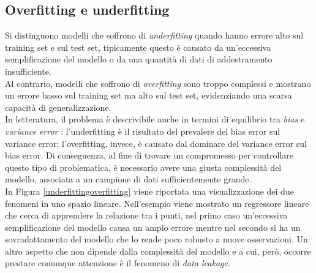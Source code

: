 \documentclass[12pt]{report}
\theoremstyle{definition}
\begin{document}
\subsection{Overfitting e underfitting}
Si distinguono modelli che soffrono di \textit{underfitting} quando hanno errore alto sul training set e sul test set, tipicamente questo è causato da un'eccessiva semplificazione del modello o da una quantità di dati di addestramento insufficiente.
\\
Al contrario, modelli che soffrono di \textit{overfitting} sono troppo complessi e mostrano un errore basso sul training set ma alto sul test set, evidenziando una scarsa capacità di generalizzazione.
\\
In letteratura, il problema è descrivibile anche in termini di equilibrio tra \textit{bias} e \textit{variance error} \cite{31}: l'underfitting è il risultato del prevalere del bias error sul variance error; l'overfitting, invece, è causato dal dominare del variance error sul bias error.
Di conseguenza, al fine di trovare un compromesso per controllare questo tipo di problematica, è necessario avere una giusta complessità del modello, associata a un campione di dati sufficientemente grande.
\\
In Figura \ref{underfittingoverfitting} viene riportata una visualizzazione dei due fenomeni in uno spazio lineare. Nell'esempio viene mostrato un regressore lineare che cerca di apprendere la relazione tra i punti, nel primo caso un'eccessiva semplificazione del modello causa un ampio errore mentre nel secondo si ha un sovradattamento del modello che lo rende poco robusto a nuove osservazioni.
Un altro aspetto che non dipende dalla complessità del modello e a cui, però, occorre prestare comunque attenzione è il fenomeno di \textit{data leakage}.
\end{document}
